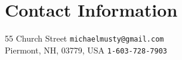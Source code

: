 \section{\sc Contact Information}
55 Church Street \hfill \texttt{michaelmusty@gmail.com}\\
Piermont, NH, 03779, USA \hfill \texttt{1-603-728-7903}


